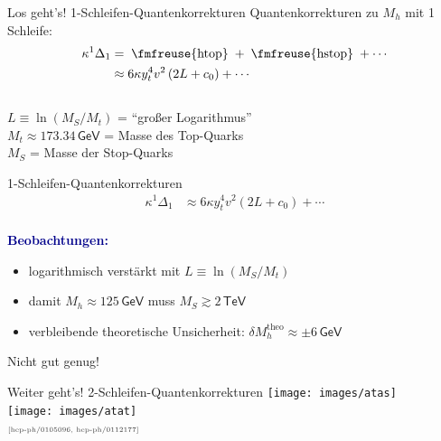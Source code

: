 \documentclass[hyperref={pdfpagelabels=false},ngerman]{beamer}
\newcommand{\fmfvcenter}[1]{\;\vcenter{\hbox{\fmfreuse{#1}}}\;}
\newcommand{\eh}[1]{\,\mathsf{#1}}
\newcommand{\MS}{\ensuremath{M_S}}
\newcommand{\mycite}[1]{\ensuremath{\text{\textcolor{darkgray}{\tiny [#1]}}}}
\renewcommand{\emph}[1]{\textbf{\textcolor{darkblue}{#1}}}
\newcommand{\GeV}{\eh{GeV}}
\newcommand{\TeV}{\eh{TeV}}
\begin{document}
\begin{frame}{Los geht's! 1-Schleifen-Quantenkorrekturen}
  Quantenkorrekturen zu $M_h$ mit 1 Schleife:
  \begin{align*}
    \kappa^1\Delta_1
    &= \fmfvcenter{htop} + \fmfvcenter{hstop} + \cdots \\
    &\approx 6 \kappa y_t^4 v^2 \left(
      2L + c_0
    \right) + \cdots
  \end{align*}
  \\[1em]
  $L\equiv\ln(\MS / M_t)$ = ``großer Logarithmus'' \\[0.5em]
  $M_t \approx 173.34\GeV$ = Masse des Top-Quarks \\[0.5em]
  $\MS$ = Masse der Stop-Quarks%
\end{frame}

\begin{frame}{1-Schleifen-Quantenkorrekturen}
  \begin{align*}
    \kappa^1\Delta_1 &\approx
    6 \kappa y_t^4 v^2 \left(
      2L + c_0
    \right) + \cdots
  \end{align*}
  \\[1em]
  \emph{Beobachtungen:}
  \begin{itemize}
  \item logarithmisch verstärkt mit $L\equiv\ln(\MS / M_t)$
  \item damit $M_h \approx 125\eh{GeV}$ muss $\MS \gtrsim 2\TeV$
  \item verbleibende theoretische Unsicherheit: $\delta M_h^{\text{theo}} \approx \pm 6 \GeV$
  \end{itemize}
  \vspace*{1em}
  Nicht gut genug!
\end{frame}

\begin{frame}{Weiter geht's! 2-Schleifen-Quantenkorrekturen}
  \texttt{[image: images/atas]}\\[1em]
  \texttt{[image: images/atat]}
  \\
  \vspace*{1em}
  \mycite{hep-ph/0105096, hep-ph/0112177}
\end{frame}
\end{document}
